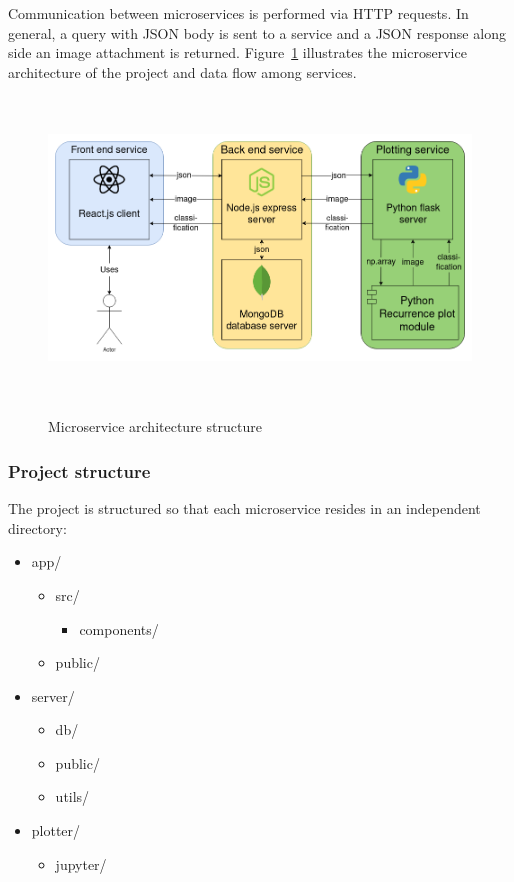 \documentclass[a4paper,12pt,fleqn]{article}
\begin{document}
Communication between microservices is performed via HTTP requests. In general, a query with JSON body is sent to a service and a JSON response along side an image attachment is returned.
Figure~\ref{fig:architecture_diagram} illustrates the microservice architecture of the project and data flow among services.

\begin{figure}[h]
  \centering
  {\includegraphics[height=8cm]{assets/architecture_diagram.png}}
  \caption{Microservice architecture structure}
  \label{fig:architecture_diagram}
\end{figure}


\subsubsection{Project structure}
The project is structured so that each microservice resides in an independent directory:
\begin{itemize}
  \item app/
        \begin{itemize}
          \item src/
                \begin{itemize}
                  \item components/
                \end{itemize}
          \item public/
        \end{itemize}
  \item server/
        \begin{itemize}
          \item db/
          \item public/
          \item utils/
        \end{itemize}
  \item plotter/
        \begin{itemize}
          \item jupyter/
        \end{itemize}
\end{itemize}
\end{document}
